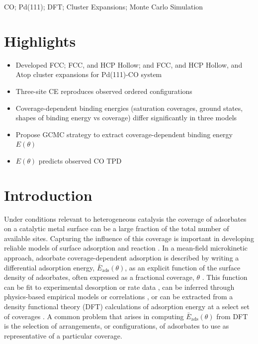 \documentclass[11pt]{article}
\begin{document}
CO; Pd(111); DFT; Cluster Expansions; Monte Carlo Simulation

\section*{Highlights}
\begin{itemize}
	\item Developed FCC; FCC, and HCP Hollow; and FCC, and HCP Hollow, and Atop cluster expansions for Pd(111)-CO system 
	\item Three-site CE reproduces observed ordered configurations
	\item Coverage-dependent binding energies (saturation coverages, ground states, shapes of binding energy vs coverage) differ significantly in three models
	\item Propose GCMC strategy to extract coverage-dependent binding energy $E(\theta)$
	\item $E(\theta)$ predicts observed CO TPD
\end{itemize}

\section{Introduction}

Under conditions relevant to heterogeneous catalysis the coverage of adsorbates on a catalytic metal surface can be a large fraction of the total number of available sites.  Capturing the influence of this coverage is important in developing reliable models of surface adsorption and reaction \cite{Stampfl1999,Grabow2008, Gokhale2008, Getman2010, Grabow2010, Salciccioli2011, Wu2012, Stamatakis2014}.  In a mean-field microkinetic approach, adsorbate coverage-dependent adsorption is described by writing a differential adsorption energy, $\bar{E}_\text{ads}\left( \theta \right)$, as an explicit function of the surface density of adsorbates, often expressed as a fractional coverage, $\theta$ \cite{Grabow2008, Grabow2010,Getman2010,  Gokhale2008, Gomez-Marin2013}.
This function can be fit to experimental desorption or rate data \cite{Guo1989, Dulieu2013, Acharyya2007},%
can be inferred through physics-based empirical models\cite{Shustorovich1998,Maestri2011} or correlations \cite{Miller2014}, %
or can be extracted from a density functional theory (DFT) calculations of adsorption energy at a select set of coverages \cite{Grabow2008, Gokhale2008}.  A common problem that arises in computing $\bar{E}_\text{ads}(\theta)$ from DFT is the selection of arrangements, or configurations, of adsorbates to use as representative of a particular coverage.  
\end{document}
